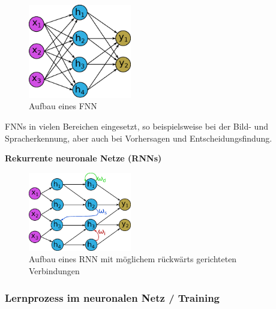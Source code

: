 \begin{figure}[!ht]
	\includegraphics[width=0.4\textwidth]{content/chapter_basics/images/neuronal_network_fnn.eps}
	\centering
	\caption{Aufbau eines FNN}
	\label{img:neural_network_fnn}
\end{figure}

FNNs in vielen Bereichen eingesetzt, so beispielsweise bei der Bild- und Spracherkennung, aber auch bei Vorhersagen und Entscheidungsfindung.\vspace{0.2cm}

\textbf{Rekurrente neuronale Netze (RNNs)}\vspace{0.2cm}

\begin{figure}[!ht]
	\includegraphics[width=0.4\textwidth]{content/chapter_basics/images/neuronal_network_rnn.eps}
	\centering
	\caption{Aufbau eines RNN mit möglichem rückwärts gerichteten Verbindungen}
	\label{img:neural_network_rnn}
\end{figure}





\subsubsection{Lernprozess im neuronalen Netz / Training}

